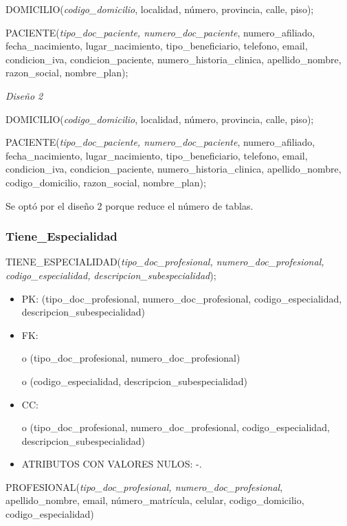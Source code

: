 \documentclass[a4paper,11pt]{article}
\begin{document}
DOMICILIO(\emph{codigo\_domicilio}, localidad, número, provincia, calle, piso);

PACIENTE(\emph{tipo\_doc\_paciente, numero\_doc\_paciente}, numero\_afiliado, fecha\_nacimiento, 
lugar\_nacimiento, tipo\_beneficiario, telefono, email, condicion\_iva, condicion\_paciente, 
numero\_historia\_clinica, apellido\_nombre, razon\_social,  nombre\_plan);

\textit{Diseño 2}

DOMICILIO(\emph{codigo\_domicilio}, localidad, número, provincia, calle, piso);

PACIENTE(\emph{tipo\_doc\_paciente, numero\_doc\_paciente}, numero\_afiliado, fecha\_nacimiento, 
lugar\_nacimiento, tipo\_beneficiario, telefono, email, condicion\_iva, condicion\_paciente, 
numero\_historia\_clinica, apellido\_nombre, codigo\_domicilio, razon\_social, 
 nombre\_plan);

Se optó por el diseño 2 porque reduce el número de tablas.\label{HToc293405844}

\subsubsection{\textbf{Tiene\_Especialidad}}

TIENE\_ESPECIALIDAD(\emph{tipo\_doc\_profesional, numero\_doc\_profesional, codigo\_especialidad,} 
\emph{descripcion\_subespecialidad});

\begin{itemize}
\item PK: (tipo\_doc\_profesional, numero\_doc\_profesional, codigo\_especialidad, 
descripcion\_subespecialidad)

\item FK: 

o (tipo\_doc\_profesional, numero\_doc\_profesional)

o (codigo\_especialidad, descripcion\_subespecialidad)

\item CC:

o (tipo\_doc\_profesional, numero\_doc\_profesional, codigo\_especialidad, descripcion\_subespecialidad)

\item ATRIBUTOS CON VALORES NULOS:  -.
\end{itemize}

PROFESIONAL(\emph{tipo\_doc\_profesional, numero\_doc\_profesional}, apellido\_nombre, 
email, número\_matrícula, celular,\textit{\textbf{ }}codigo\_domicilio, codigo\_especialidad)
\end{document}
